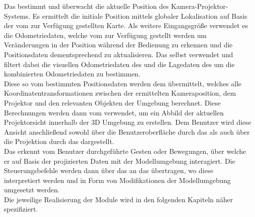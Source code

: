 Das \mLocalization bestimmt und überwacht die aktuelle Position des Kamera-Projektor-Systems. Es ermittelt die initiale Position mittels globaler Lokalisation auf Basis der vom \mMapserver zur Verfügung gestellten Karte. Als weitere Eingangsgröße verwendet es die Odometriedaten, welche vom \mEkf zur Verfügung gestellt werden um Veränderungen in der Position während der Bedienung zu erkennen und die Positionsdaten dementsprechend zu aktualisieren. Das \mEkf selbst verwendet und filtert dabei die visuellen Odometriedaten des \mFovis und die Lagedaten des \mImu {} um die kombinierten Odometriedaten zu bestimmen.\\
Diese so vom \mLocalization bestimmten Positionsdaten werden dem \mTransformation übermittelt, welches alle Koordinatentransformationen zwischen der ermittelten Kameraposition, dem Projektor und den relevanten Objekten der Umgebung berechnet. Diese Berechnungen werden dann vom \mVisualization verwendet, um ein Abbild der aktuellen Projektorsicht innerhalb der 3D Umgebung zu erstellen. Dem Benutzer wird diese Ansicht anschließend sowohl über die Benutzeroberfläche durch das \mGui als auch über die Projektion durch das \mProjection dargestellt. \\
Das \mInteraction erkennt vom Benutzer durchgeführte Gesten oder Bewegungen, über welche er auf Basis der projizierten Daten mit der Modellumgebung interagiert. Die Steuerungsbefehle werden dann über das \mTransformation an das \mVisualization übertragen, wo diese interpretiert werden und in Form von Modifikationen der Modellumgebung umgesetzt werden.\\
Die jeweilige Realisierung der Module wird in den folgenden Kapiteln näher spezifiziert.\\

